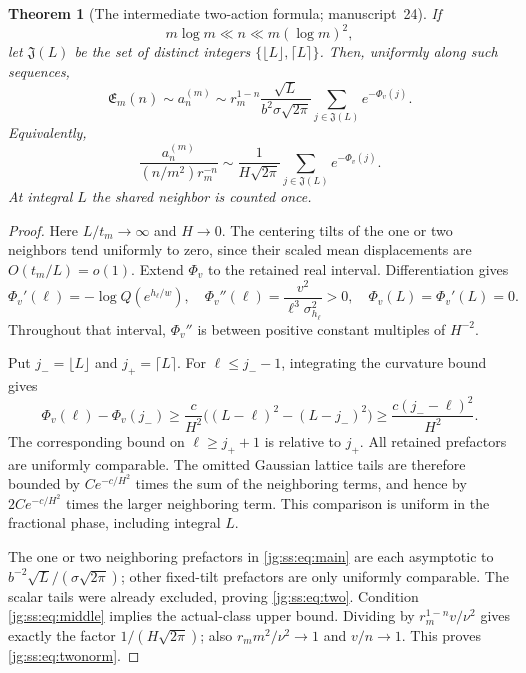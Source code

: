 \documentclass[11pt,a4paper]{article}
\newtheorem{theorem}{Theorem}[section]
\theoremstyle{definition}\newaliascnt{definition}{theorem}
\theoremstyle{remark}\newaliascnt{remark}{theorem}
\begin{document}
\begin{theorem}[The intermediate two-action formula; manuscript~24]
\label{jg:ss:thm:two}
If
\begin{equation}\label{jg:ss:eq:middle}
 m\log m\ll n\ll m(\log m)^2,
\end{equation}
let $\mathfrak J(L)$ be the set of distinct integers
$\{\lfloor L\rfloor,\lceil L\rceil\}$. Then, uniformly along such sequences,
\begin{equation}\label{jg:ss:eq:two}
 \mathfrak E_m(n)\sim a_n^{(m)}
 \sim r_m^{1-n}\frac{\sqrt L}{b^2\sigma\sqrt{2\pi}}
          \sum_{j\in\mathfrak J(L)}e^{-\Phi_v(j)}.
\end{equation}
Equivalently,
\begin{equation}\label{jg:ss:eq:twonorm}
 \frac{a_n^{(m)}}{(n/m^2)r_m^{-n}}
 \sim\frac1{H\sqrt{2\pi}}\sum_{j\in\mathfrak J(L)}e^{-\Phi_v(j)}.
\end{equation}
At integral $L$ the shared neighbor is counted once.
\end{theorem}

\begin{proof}
Here $L/t_m\to\infty$ and $H\to0$. The centering tilts of the one or two
neighbors tend uniformly to zero, since their scaled mean displacements are
$O(t_m/L)=o(1)$. Extend $\Phi_v$ to the retained real interval.
Differentiation gives
\begin{equation}\label{jg:ss:eq:curvature}
 \Phi_v'(\ell)=-\log Q(e^{h_\ell/w}),\quad
 \Phi_v''(\ell)=\frac{v^2}{\ell^3\sigma_{h_\ell}^2}>0,\quad
 \Phi_v(L)=\Phi_v'(L)=0.
\end{equation}
Throughout that interval, $\Phi_v''$ is between positive constant multiples of
$H^{-2}$.

Put $j_-=\lfloor L\rfloor$ and $j_+=\lceil L\rceil$. For $\ell\le j_--1$,
integrating the curvature bound gives
\[
 \Phi_v(\ell)-\Phi_v(j_-)
 \ge \frac{c}{H^2}\big((L-\ell)^2-(L-j_-)^2\big)
 \ge \frac{c(j_--\ell)^2}{H^2}.
\]
The corresponding bound on $\ell\ge j_++1$ is relative to $j_+$. All retained
prefactors are uniformly comparable. The omitted Gaussian lattice tails are
therefore bounded by $Ce^{-c/H^2}$ times the sum of the neighboring terms, and
hence by $2Ce^{-c/H^2}$ times the larger neighboring term. This comparison is
uniform in the fractional phase, including integral $L$.

The one or two neighboring prefactors in \eqref{jg:ss:eq:main} are each
asymptotic to $b^{-2}\sqrt L/(\sigma\sqrt{2\pi})$; other fixed-tilt prefactors
are only uniformly comparable. The scalar tails were already excluded, proving
\eqref{jg:ss:eq:two}. Condition \eqref{jg:ss:eq:middle} implies the actual-class
upper bound. Dividing by $r_m^{1-n}v/\nu^2$ gives exactly the factor
$1/(H\sqrt{2\pi})$; also $r_mm^2/\nu^2\to1$ and $v/n\to1$. This proves
\eqref{jg:ss:eq:twonorm}.
\end{proof}
\end{document}
